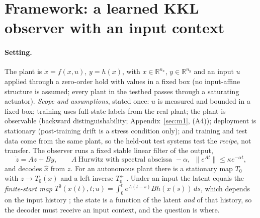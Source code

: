 \section{Framework: a learned KKL observer with an input context}\label{sec:framework}

\paragraph{Setting.} The plant is $\dot x=f(x,u)$, $y=h(x)$, with $x\in\mathbb R^{n_x}$, $y\in\mathbb R^{n_y}$ and an input $u$ applied through a zero-order hold with values in a fixed box (no input-affine structure is assumed; every plant in the testbed passes through a saturating actuator). \emph{Scope and assumptions}, stated once: $u$ is measured and bounded in a fixed box; training uses full-state labels from the real plant; the plant is observable (backward distinguishability; Appendix~\ref{sec:m1}, (A4)); deployment is stationary (post-training drift is a stress condition only); and training and test data come from the same plant, so the held-out test systems test the \emph{recipe}, not transfer. The observer runs a fixed stable linear filter of the output,
\begin{equation}\label{eq:latent}
\dot z = Az + By,\qquad A\ \text{Hurwitz with spectral abscissa }-\alpha,\ \ \|e^{At}\|\le\kappa e^{-\alpha t},
\end{equation}
and decodes $\hat x$ from $z$. For an autonomous plant there is a stationary map $T_0$ with $z\to T_0(x)$ and a left inverse $T_0^+$ \citep{andrieu2006existence}. Under an input the latent equals the \emph{finite-start map} $T^0(x(t),t;u)=\int_0^t e^{A(t-s)}Bh(x(s))\,ds$, which depends on the input history \citep{bernard2019luenberger}; the state is a function of the latent \emph{and} of that history, so the decoder must receive an input context, and the question is where.

